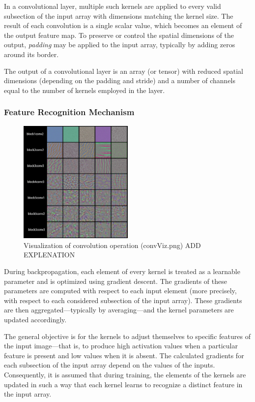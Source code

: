 \documentclass{pracalicmgr}
\begin{document}
In a convolutional layer, multiple such kernels are applied to every valid subsection of the input array with dimensions matching the kernel size. The result of each convolution is a single scalar value, which becomes an element of the output feature map. To preserve or control the spatial dimensions of the output, \textit{padding} may be applied to the input array, typically by adding zeros around its border.

The output of a convolutional layer is an array (or tensor) with reduced spatial dimensions (depending on the padding and stride) and a number of channels equal to the number of kernels employed in the layer.

\subsubsection{Feature Recognition Mechanism}

\begin{figure}[H]
    \centering
    \includegraphics[width=0.5\textwidth]{src/convViz.png}
    \caption{Visualization of convolution operation (convViz.png) {ADD EXPLENATION}\cite{exCNN}}
\end{figure}

During backpropagation, each element of every kernel is treated as a learnable parameter and is optimized using gradient descent. The gradients of these parameters are computed with respect to each input element (more precisely, with respect to each considered subsection of the input array). These gradients are then aggregated—typically by averaging—and the kernel parameters are updated accordingly.

The general objective is for the kernels to adjust themselves to specific features of the input image—that is, to produce high activation values when a particular feature is present and low values when it is absent. The calculated gradients for each subsection of the input array depend on the values of the inputs. Consequently, it is assumed that during training, the elements of the kernels are updated in such a way that each kernel learns to recognize a distinct feature in the input array.
\end{document}
